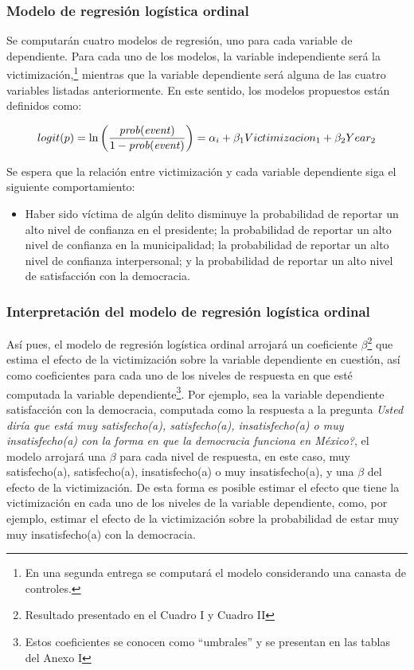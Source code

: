 \documentclass[letterpaper]{article}
\begin{document}
\subsubsection{Modelo de regresión logística ordinal}

Se computarán cuatro modelos de regresión, uno para cada variable de dependiente. Para cada uno de los modelos, la variable independiente será la victimización,\footnote{En una segunda entrega se computará el modelo considerando una canasta de controles.} mientras que  la variable dependiente será alguna de las cuatro variables listadas anteriormente. En este sentido, los modelos propuestos están definidos como:

\[
logit(p) = \ln\left(\frac{\text{\emph{prob}(\emph{event})}}{1 - \text{\emph{prob}(\emph{event})}}\right) = \alpha_i + \beta_1 Victimizacion_1 + \beta_2 Year_2 
\]

Se espera que la relación entre victimización y cada variable dependiente siga el siguiente comportamiento:

\vspace{-0.2cm}
\begin{itemize}
\setlength{\itemsep}{0pt}%
\setlength{\parskip}{0pt}%
\item Haber sido víctima de algún delito disminuye la probabilidad de reportar un alto nivel de confianza en el presidente; la probabilidad de reportar un alto nivel de confianza en la municipalidad; la probabilidad de reportar un alto nivel de confianza interpersonal; y la probabilidad de reportar un alto nivel de satisfacción con la democracia.
\end{itemize}

\subsubsection{Interpretación del modelo de regresión logística ordinal} 

Así pues, el modelo de regresión logística ordinal arrojará un coeficiente $\beta$\footnote{Resultado presentado en el Cuadro I y Cuadro II} que estima el efecto de la victimización sobre la variable dependiente en cuestión, así como coeficientes para cada uno de los niveles de respuesta en que esté computada la variable dependiente\footnote{Estos coeficientes se conocen como ``umbrales'' y se presentan en las tablas del Anexo I}. Por ejemplo, sea la variable dependiente satisfacción con la democracia, computada como la respuesta a la pregunta \emph{Usted diría que está muy satisfecho(a), satisfecho(a), insatisfecho(a) o muy insatisfecho(a) con la forma en que la democracia funciona en México?}, el modelo arrojará una $\beta$ para cada nivel de respuesta, en este caso, muy satisfecho(a), satisfecho(a), insatisfecho(a) o muy insatisfecho(a), y una $\beta$ del efecto de la victimización. De esta forma es posible estimar el efecto que tiene la victimización en cada uno de los niveles de la variable dependiente, como, por ejemplo, estimar el efecto de la victimización sobre la probabilidad de estar muy muy insatisfecho(a) con la democracia.
\end{document}
